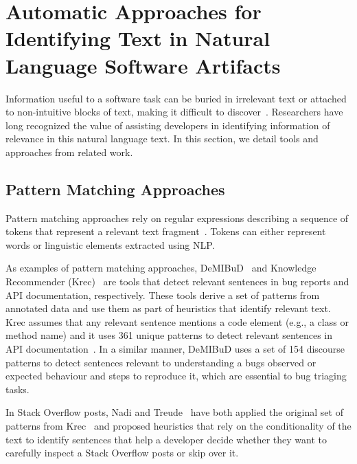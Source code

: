\section{Automatic Approaches for Identifying Text in Natural Language Software Artifacts}
\label{cp2:text-approaches}



Information useful to a software task can be buried in irrelevant text or attached to 
non-intuitive blocks of text, making it difficult to discover~\cite{Robillard2015}.
Researchers have long recognized the value of assisting developers in 
identifying information of relevance in this natural language
text.
In this section, we detail tools and approaches from related work.




\subsection{Pattern Matching Approaches}
\label{cp2:pattern-matching}


Pattern matching approaches rely on regular expressions describing a sequence of tokens that represent
 a relevant text fragment~\cite{Bavota2016}. Tokens can either represent words or linguistic elements 
extracted using \acf{NLP}.
    
    
As examples  of pattern matching approaches,  {\small DeMIBuD}~\cite{Chaparro2017}
 and Knowledge Recommender (Krec)~\cite{Maalej2013, Robillard2015} are tools that detect relevant sentences in bug reports and API documentation, respectively. 
These tools derive a set of patterns from annotated data and use them as part of heuristics 
that identify relevant text. Krec assumes that any relevant sentence mentions a 
code element (e.g., a class or method name) and it uses  361 unique patterns
to 
detect relevant sentences in API documentation~\cite{Robillard2015}.
In a similar manner, {\small DeMIBuD} uses a set of 154 discourse patterns to detect sentences 
relevant to understanding a bugs observed or expected behaviour and steps to reproduce it,
which are essential to bug triaging tasks.




In Stack Overflow posts,
Nadi and Treude~\cite{nadi2020} have both applied the original set of patterns from Krec~\cite{Robillard2015} 
and proposed heuristics that rely on the conditionality of the text
to identify sentences that help a developer 
decide whether they want to carefully inspect a Stack Overflow posts or skip over it. 




